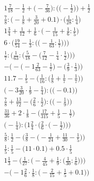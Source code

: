 \documentclass[8pt]{article}
\begin{document}
\begin{align}
1\frac{7}{18} - \frac{1}{2} + \Big(-\frac{7}{36}\Big) : \Big(\big(-\frac{1}{2}\big)\Big) + \frac{1}{2} \\
\frac{7}{8} : \big(-\frac{1}{8} + \frac{3}{20} + 0.1\big) \cdot \big(\frac{1}{28} : \frac{1}{4}\big) \\
1\frac{3}{4} + \frac{1}{12} + \frac{1}{6} \cdot \big(-\frac{1}{15} + \frac{1}{6} : \frac{1}{5}\big) \\
6 \cdot \bigg(\frac{19}{54} - \frac{1}{3} : \Big(\big(-\frac{1}{63} : \frac{1}{7}\big)\Big)\bigg) \\
\frac{1}{7} : \bigg(\frac{1}{63} : \Big(\frac{5}{18} - \big(\frac{7}{12} - \frac{1}{4} \cdot \frac{1}{2}\big)\Big)\bigg) \\
-\Big(-\big(-1\frac{2}{63} - \frac{1}{7}\big) - \big(\frac{3}{9} \cdot \frac{1}{3}\big)\Big) \\
11.7 - \frac{1}{5} - \Big(\frac{1}{16} : \big(\frac{1}{8} + \frac{1}{7} - \frac{1}{7}\big)\Big) \\
\Big(-3\frac{3}{20} \cdot \frac{1}{9} - \frac{1}{4}\Big) : \Big(\big(-0.1\big)\Big) \\
\frac{7}{8} + \frac{13}{72} - \Big(\frac{2}{6} \cdot \frac{1}{2}\Big) : \Big(\big(-\frac{1}{9}\big)\Big) \\
\frac{31}{36} + 2 \cdot \frac{1}{8} - \big(\frac{17}{315} + \frac{1}{5} - \frac{1}{7}\big) \\
\bigg(-\frac{1}{4}\bigg) : \bigg(1\frac{2}{4} \cdot \Big(\frac{2}{6} \cdot \big(-\frac{1}{2}\big)\Big)\bigg) \\
\frac{5}{8} : \frac{1}{2} - \Big(\frac{3}{8} - \big(-\frac{1}{24} + \frac{11}{30} - \frac{1}{5}\big)\Big) \\
\frac{1}{5} : \frac{1}{5} - \big(11 \cdot 0.1\big) + 0.5 \cdot \frac{1}{5} \\
1\frac{1}{3} - \bigg(\frac{1}{27} : \Big(-\frac{4}{45} + \frac{1}{9} : \big(\frac{1}{30} : \frac{1}{6}\big)\Big)\bigg) \\
-\Big(-1\frac{2}{6} \cdot \frac{1}{8} : \big(-\frac{2}{15} + \frac{1}{5} + 0.1\big)\Big)
\end{align}
\end{document}
